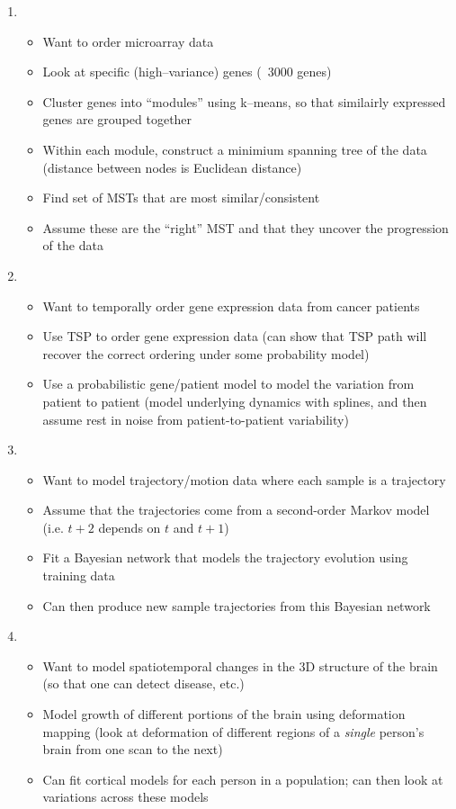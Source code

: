 \documentclass[12pt]{article}
\begin{document}
\begin{enumerate}
\item {}
\begin{itemize}
	\item Want to order microarray data
	\item Look at specific (high--variance) genes (~3000 genes)
	\item Cluster genes into ``modules'' using k--means, so that similairly expressed genes are grouped together
	\item Within each module, construct a minimium spanning tree of the data (distance between nodes is Euclidean distance)
	\item Find set of MSTs that are most similar/consistent
	\item Assume these are the ``right'' MST and that they uncover the progression of the data
\end{itemize}

\item {}
\begin{itemize}
	\item Want to temporally order gene expression data from cancer patients
	\item Use TSP to order gene expression data (can show that TSP path will recover the correct ordering under some probability model)
	\item Use a probabilistic gene/patient model to model the variation from patient to patient (model underlying dynamics with splines, and then assume rest in noise from patient-to-patient variability)
\end{itemize}

\item {}
\begin{itemize}
	\item Want to model trajectory/motion data where each sample is a trajectory
	\item Assume that the trajectories come from a second-order Markov model (i.e. $t+2$ depends on $t$ and $t+1$)
	\item Fit a Bayesian network that models the trajectory evolution using training data
	\item Can then produce new sample trajectories from this Bayesian network
\end{itemize}

\item {}
\begin{itemize}
	\item Want to model spatiotemporal changes in the 3D structure of the brain (so that one can detect disease, etc.)
	\item Model growth of different portions of the brain using deformation mapping (look at deformation of different regions of a {\em single} person's brain from one scan to the next)
	\item Can fit cortical models for each person in a population; can then look at variations across these models
\end{itemize}  


\end{enumerate}
\end{document}

